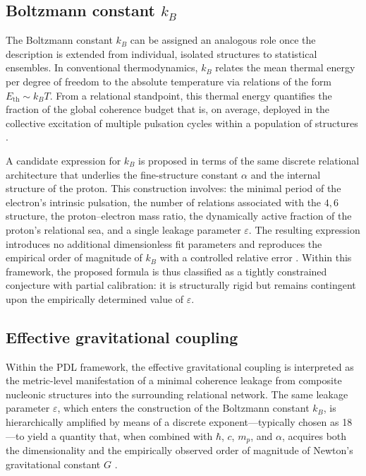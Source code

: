 \documentclass[11pt,a4paper]{article}
\begin{document}
\subsection{Boltzmann constant \texorpdfstring{\(k_B\)}{kB}}
\label{subsec:kB}

The Boltzmann constant \(k_B\) can be assigned an analogous role once the description is extended from individual, isolated structures to statistical ensembles. In conventional thermodynamics, \(k_B\) relates the mean thermal energy per degree of freedom to the absolute temperature via relations of the form \(E_{\mathrm{th}} \sim k_B T\). From a relational standpoint, this thermal energy quantifies the fraction of the global coherence budget that is, on average, deployed in the collective excitation of multiple pulsation cycles within a population of structures
\citep{PDL_Main_2026,PDL_position}.

A candidate expression for \(k_B\) is proposed in terms of the same discrete relational architecture that underlies the fine-structure constant \(\alpha\) and the internal structure of the proton. This construction involves: the minimal period of the electron’s intrinsic pulsation, the number of relations associated with the \(4,6\) structure, the proton–electron mass ratio, the dynamically active fraction of the proton’s relational sea, and a single leakage parameter \(\varepsilon\). The resulting expression introduces no additional dimensionless fit parameters and reproduces the empirical order of magnitude of \(k_B\) with a controlled relative error
\citep{PDL_Main_2026,Coherence_Leakage_18_2026}. Within this framework, the proposed formula is thus classified as a tightly constrained conjecture with partial calibration: it is structurally rigid but remains contingent upon the empirically determined value of \(\varepsilon\).

\subsection{Effective gravitational coupling}
\label{subsec:gravity_constant}

Within the PDL framework, the effective gravitational coupling is interpreted as the metric-level manifestation of a minimal coherence leakage from composite nucleonic structures into the surrounding relational network. The same leakage parameter \(\varepsilon\), which enters the construction of the Boltzmann constant \(k_B\), is hierarchically amplified by means of a discrete exponent—typically chosen as 18—to yield a quantity that, when combined with \(\hbar\), \(c\), \(m_p\), and \(\alpha\), acquires both the dimensionality and the empirically observed order of magnitude of Newton’s gravitational constant \(G\)
\citep{PDL_Main_2026,Exponent_18_PDL_2026,PDL_position}.
\end{document}

